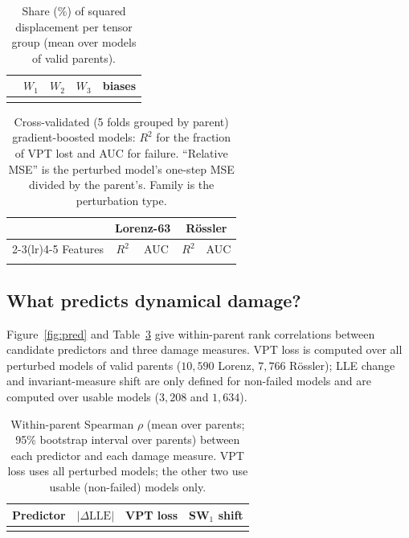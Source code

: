 \documentclass[11pt]{article}
\newcommand{\LLE}{\mathrm{LLE}}
\begin{document}
\begin{table}[t]
\centering\small
\caption{Share (\%) of squared displacement per tensor group (mean over models of valid parents).}\label{tab:shares}
\begin{tabular}{lcccc}
\toprule
 & $W_1$ & $W_2$ & $W_3$ & biases\\
\midrule
\\
\bottomrule
\end{tabular}
\end{table}

\begin{table}[t]
\centering\small
\caption{Cross-validated (5 folds grouped by parent) gradient-boosted models: $R^2$ for the fraction of VPT lost and AUC for failure. ``Relative MSE'' is the perturbed model's one-step MSE divided by the parent's. Family is the perturbation type.}\label{tab:cv}
\begin{tabular}{lcccc}
\toprule
 & \multicolumn{2}{c}{Lorenz-63} & \multicolumn{2}{c}{R\"ossler}\\
\cmidrule(lr){2-3}\cmidrule(lr){4-5}
Features & $R^2$ & AUC & $R^2$ & AUC\\
\midrule
\\
\bottomrule
\end{tabular}
\end{table}

\subsection{What predicts dynamical damage?}\label{sec:pred}
Figure~\ref{fig:pred} and Table~\ref{tab:pred} give within-parent rank correlations between candidate predictors and three damage measures. VPT loss is computed over all perturbed models of valid parents ($10{,}590$ Lorenz, $7{,}766$ R\"ossler); LLE change and invariant-measure shift are only defined for non-failed models and are computed over usable models ($3{,}208$ and $1{,}634$).

\begin{table}[t]
\centering\small
\caption{Within-parent Spearman $\rho$ (mean over parents; 95\% bootstrap interval over parents) between each predictor and each damage measure. VPT loss uses all perturbed models; the other two use usable (non-failed) models only.}\label{tab:pred}
\begin{tabular}{lccc}
\toprule
Predictor & $|\Delta\LLE|$ & VPT loss & SW$_1$ shift\\
\midrule
\\
\bottomrule
\end{tabular}
\end{table}
\end{document}
